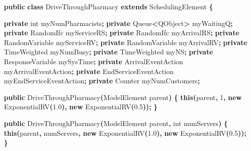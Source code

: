 \documentclass[
]{book}
\newenvironment{Shaded}{\begin{snugshade}}{\end{snugshade}}
\newcommand{\BuiltInTok}[1]{#1}
\newcommand{\DataTypeTok}[1]{\textcolor[rgb]{0.13,0.29,0.53}{#1}}
\newcommand{\DecValTok}[1]{\textcolor[rgb]{0.00,0.00,0.81}{#1}}
\newcommand{\FloatTok}[1]{\textcolor[rgb]{0.00,0.00,0.81}{#1}}
\newcommand{\FunctionTok}[1]{\textcolor[rgb]{0.00,0.00,0.00}{#1}}
\newcommand{\KeywordTok}[1]{\textcolor[rgb]{0.13,0.29,0.53}{\textbf{#1}}}
\newcommand{\NormalTok}[1]{#1}
\newcommand{\OperatorTok}[1]{\textcolor[rgb]{0.81,0.36,0.00}{\textbf{#1}}}
\theoremstyle{definition}
\theoremstyle{definition}
\theoremstyle{definition}
\theoremstyle{definition}
\theoremstyle{remark}
\begin{document}
\begin{Shaded}
\begin{Highlighting}[]
\KeywordTok{public} \KeywordTok{class}\NormalTok{ DriveThroughPharmacy }\KeywordTok{extends}\NormalTok{ SchedulingElement }\OperatorTok{\{}

    \KeywordTok{private} \DataTypeTok{int}\NormalTok{ myNumPharmacists}\OperatorTok{;}
    \KeywordTok{private} \BuiltInTok{Queue}\OperatorTok{\textless{}}\NormalTok{QObject}\OperatorTok{\textgreater{}}\NormalTok{ myWaitingQ}\OperatorTok{;}
    \KeywordTok{private}\NormalTok{ RandomIfc myServiceRS}\OperatorTok{;}
    \KeywordTok{private}\NormalTok{ RandomIfc myArrivalRS}\OperatorTok{;}
    \KeywordTok{private}\NormalTok{ RandomVariable myServiceRV}\OperatorTok{;}
    \KeywordTok{private}\NormalTok{ RandomVariable myArrivalRV}\OperatorTok{;}
    \KeywordTok{private}\NormalTok{ TimeWeighted myNumBusy}\OperatorTok{;}
    \KeywordTok{private}\NormalTok{ TimeWeighted myNS}\OperatorTok{;}
    \KeywordTok{private}\NormalTok{ ResponseVariable mySysTime}\OperatorTok{;}
    \KeywordTok{private}\NormalTok{ ArrivalEventAction myArrivalEventAction}\OperatorTok{;}
    \KeywordTok{private}\NormalTok{ EndServiceEventAction myEndServiceEventAction}\OperatorTok{;}
    \KeywordTok{private}\NormalTok{ Counter myNumCustomers}\OperatorTok{;}

    \KeywordTok{public} \FunctionTok{DriveThroughPharmacy}\OperatorTok{(}\NormalTok{ModelElement parent}\OperatorTok{)} \OperatorTok{\{}
        \KeywordTok{this}\OperatorTok{(}\NormalTok{parent}\OperatorTok{,} \DecValTok{1}\OperatorTok{,}
                \KeywordTok{new} \FunctionTok{ExponentialRV}\OperatorTok{(}\FloatTok{1.0}\OperatorTok{),} \KeywordTok{new} \FunctionTok{ExponentialRV}\OperatorTok{(}\FloatTok{0.5}\OperatorTok{));}
    \OperatorTok{\}}

    \KeywordTok{public} \FunctionTok{DriveThroughPharmacy}\OperatorTok{(}\NormalTok{ModelElement parent}\OperatorTok{,} \DataTypeTok{int}\NormalTok{ numServers}\OperatorTok{)} \OperatorTok{\{}
        \KeywordTok{this}\OperatorTok{(}\NormalTok{parent}\OperatorTok{,}\NormalTok{ numServers}\OperatorTok{,} \KeywordTok{new} \FunctionTok{ExponentialRV}\OperatorTok{(}\FloatTok{1.0}\OperatorTok{),} \KeywordTok{new} \FunctionTok{ExponentialRV}\OperatorTok{(}\FloatTok{0.5}\OperatorTok{));}
    \OperatorTok{\}}


\end{Highlighting}
\end{Shaded}
\end{document}
